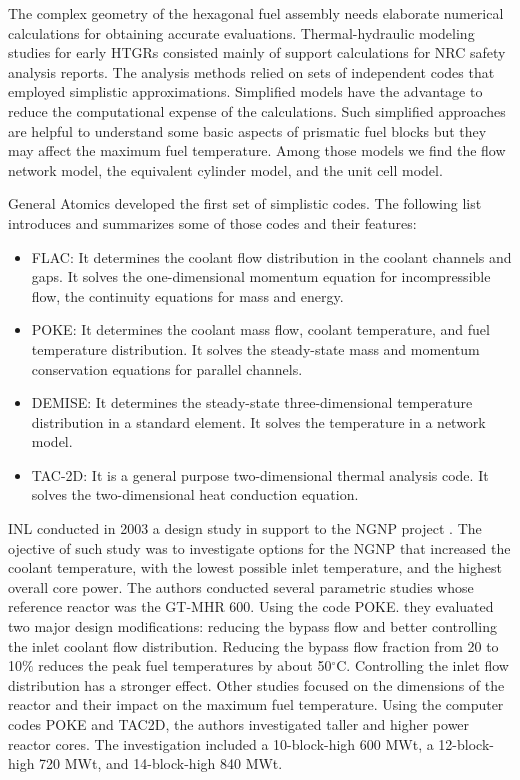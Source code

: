 \documentclass[11pt,letterpaper]{article}
\begin{document}
The complex geometry of the hexagonal fuel assembly needs elaborate numerical calculations for obtaining accurate evaluations.
Thermal-hydraulic modeling studies for early \glspl{HTGR} consisted mainly of support calculations for NRC safety analysis reports.
The analysis methods relied on sets of independent codes that employed simplistic approximations.
Simplified models have the advantage to reduce the computational expense of the calculations.
Such simplified approaches are helpful to understand some basic aspects of prismatic fuel blocks but they may affect the maximum fuel temperature.
Among those models we find the flow network model, the equivalent cylinder model, and the unit cell model.

General Atomics \cite{shenoy_htgr_1974} developed the first set of simplistic codes.
The following list introduces and summarizes some of those codes and their features:

\begin{itemize}
\item FLAC: It determines the coolant flow distribution in the coolant channels and gaps.
It solves the one-dimensional momentum equation for incompressible flow, the continuity equations for mass and energy.

\item POKE: It determines the coolant mass flow, coolant temperature, and fuel temperature distribution.
It solves the steady-state mass and momentum conservation equations for parallel channels.

\item DEMISE: It determines the steady-state three-dimensional temperature distribution in a standard element.
It solves the temperature in a network model.

\item TAC-2D: It is a general purpose two-dimensional thermal analysis code.
It solves the two-dimensional heat conduction equation.
\end{itemize}



\gls{INL} conducted in 2003 a design study in support to the \gls{NGNP} project \cite{macdonald_ngnp_2003}.
The ojective of such study was to investigate options for the NGNP that increased the coolant temperature, with the lowest possible inlet temperature, and the highest overall core power.
The authors conducted several parametric studies whose reference reactor was the GT-MHR 600.
Using the code POKE. they evaluated two major design modifications: reducing the bypass flow and better controlling the inlet coolant flow distribution.
Reducing the bypass flow fraction from 20 to 10$\%$ reduces the peak fuel temperatures by about 50$^{\circ}$C.
Controlling the inlet flow distribution has a stronger effect.
Other studies focused on the dimensions of the reactor and their impact on the maximum fuel temperature.
Using the computer codes POKE and TAC2D, the authors investigated taller and higher power reactor cores.
The investigation included a 10-block-high 600 MWt, a 12-block-high 720 MWt, and 14-block-high 840 MWt.
\end{document}
